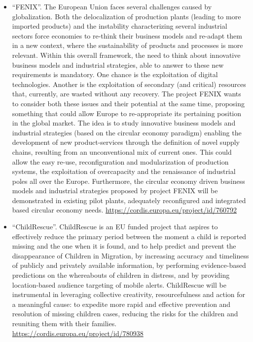 \documentclass[a4paper,oneside,10pt]{article}
\begin{document}
\begin{itemize}
\item \begin{sloppypar}
``FENIX''. The European Union faces several challenges caused by globalization. Both the delocalization of production plants (leading to more imported products) and the instability characterizing several industrial sectors force economies to re-think their business models and re-adapt them in a new context, where the sustainability of products and processes is more relevant. Within this overall framework, the need to think about innovative business models and industrial strategies, able to answer to these new requirements is mandatory. One chance is the exploitation of digital technologies. Another is the exploitation of secondary (and critical) resources that, currently, are wasted without any recovery. The project FENIX wants to consider both these issues and their potential at the same time, proposing something that could allow Europe to re-appropriate its pertaining position in the global market. The idea is to study innovative business models and industrial strategies (based on the circular economy paradigm) enabling the development of new product-services through the definition of novel supply chains, resulting from an unconventional mix of current ones. This could allow the easy re-use, reconfiguration and modularization of production systems, the exploitation of overcapacity and the renaissance of industrial poles all over the Europe. Furthermore, the circular economy driven business models and industrial strategies proposed by project FENIX will be demonstrated in existing pilot plants, adequately reconfigured and integrated based circular economy needs. \url{https://cordis.europa.eu/project/id/760792}

\end{sloppypar}

\item \begin{sloppypar}
``ChildRescue''. ChildRescue is an EU funded project that aspires to effectively reduce the primary period between the moment a child is reported missing and the one when it is found, and to help predict and prevent the disappearance of Children in Migration, by increasing accuracy and timeliness of publicly and privately available information, by performing evidence-based predictions on the whereabouts of children in distress, and by providing location-based audience targeting of mobile alerts. ChildRescue will be instrumental in leveraging collective creativity, resourcefulness and action for a meaningful cause: to expedite more rapid and effective prevention and resolution of missing children cases, reducing the risks for the children and reuniting them with their families. \url{https://cordis.europa.eu/project/id/780938}


\end{sloppypar}
\end{itemize}
\end{document}
